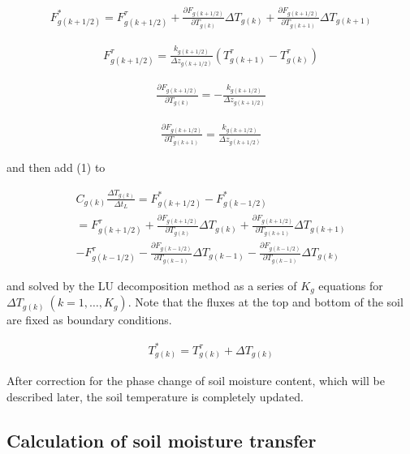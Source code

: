 \begin{eqnarray}
  F_{g(k+1/2)}^{*} = F_{g(k+1/2)}^{\tau}
+\frac{\partial {F}_{g(k+1/2)}}{\partial T_{g(k)}}
 \Delta T_{g(k)}
+\frac{\partial {F}_{g(k+1/2)}}{\partial T_{g(k+1)}}
 \Delta T_{g(k+1)}
\end{eqnarray}

\begin{eqnarray}
  F_{g(k+1/2)}^{\tau} =
\frac{k_{g(k+1/2)}}{\Delta z_{g(k+1/2)}}(T_{g(k+1)}^{\tau} - T_{g(k)}^{\tau})
\end{eqnarray}

\begin{eqnarray}
 \frac{\partial {F}_{g(k+1/2)}}{\partial T_{g(k)}} =
- \frac{k_{g(k+1/2)}}{\Delta z_{g(k+1/2)}}
\end{eqnarray}

\begin{eqnarray}
 \frac{\partial {F}_{g(k+1/2)}}{\partial T_{g(k+1)}} =
\frac{k_{g(k+1/2)}}{\Delta z_{g(k+1/2)}}
\end{eqnarray}

and then add (1) to

\begin{eqnarray}
C_{g(k)} \frac{\Delta T_{g(k)}}{\Delta t_L}
= F_{g(k+1/2)}^* - {F}_{g(k-1/2)}^*  \\
= {F}_{g(k+1/2)}^{\tau}
+\frac{\partial F_{g(k+1/2)}}{\partial T_{g(k)}}
 \Delta T_{g(k)}
+\frac{\partial F_{g(k+1/2)}}{\partial T_{g(k+1)}}
 \Delta T_{g(k+1)}  \\
- F_{g(k-1/2)}^{\tau}
-\frac{\partial F_{g(k-1/2)}}{\partial T_{g(k-1)}}
 \Delta T_{g(k-1)}
-\frac{\partial F_{g(k-1/2)}}{\partial T_{g(k-1)}}
 \Delta T_{g(k)}
\end{eqnarray}

and solved by the LU decomposition method as a series of \(K_{g}\)
equations for \(\Delta T_{g(k)}\ (k=1,\ldots,K_{g})\). Note that the
fluxes at the top and bottom of the soil are fixed as boundary
conditions.

\begin{eqnarray}
 T_{g(k)}^* = T_{g(k)}^{\tau} + \Delta T_{g(k)}
\end{eqnarray}

After correction for the phase change of soil moisture content, which
will be described later, the soil temperature is completely updated.

\hypertarget{calculation-of-soil-moisture-transfer}{%
\subsection{Calculation of soil moisture
transfer}\label{calculation-of-soil-moisture-transfer}}

